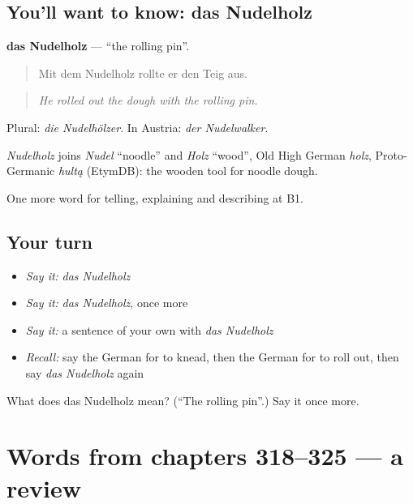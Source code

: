 \subsection*{You'll want to know: das Nudelholz}
\textbf{das Nudelholz} — \textquotedblleft{}the rolling pin\textquotedblright{}.

\begin{quote}
Mit dem Nudelholz rollte er den Teig aus.
\end{quote}

\begin{quote}
\emph{He rolled out the dough with the rolling pin.}
\end{quote}

Plural: \emph{die Nudelhölzer}. In Austria: \emph{der Nudelwalker}.

\begin{cousinweb}
\emph{Nudelholz} joins \emph{Nudel} \textquotedblleft{}noodle\textquotedblright{} and \emph{Holz} \textquotedblleft{}wood\textquotedblright{}, Old High German \emph{holz}, Proto-Germanic \emph{hultą} (EtymDB): the wooden tool for noodle dough.
\end{cousinweb}

\begin{grammarlens}[title={What you've built}]
One more word for telling, explaining and describing at B1.
\end{grammarlens}

\subsection*{Your turn}
\begin{itemize}
\raggedright
  \item \emph{Say it:} \emph{das Nudelholz}
  \item \emph{Say it:} \emph{das Nudelholz}, once more
  \item \emph{Say it:} a sentence of your own with \emph{das Nudelholz}
  \item \emph{Recall:} say the German for to knead, then the German for to roll out, then say \emph{das Nudelholz} again
\end{itemize}

\begin{tcolorbox}[breakable,colback=teal!4,colframe=teal!35!black,title={Before you move on}]
What does das Nudelholz mean? (\textquotedblleft{}The rolling pin\textquotedblright{}.) Say it once more.
\end{tcolorbox}
\section[(dialogue)]{Words from chapters 318–325 — a review}

